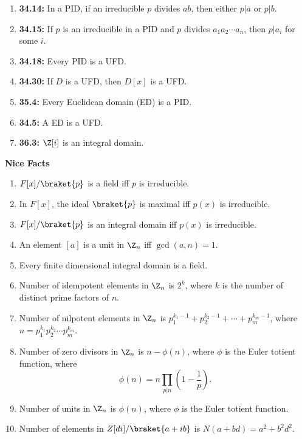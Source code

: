 \documentclass[notitlepage]{report}
\begin{document}
\begin{enumerate}
    \item \textbf{34.14:} In a PID, if an irreducible $p$ divides $ab$, then either $p|a$ or $p|b$.
    \item \textbf{34.15:} If $p$ is an irreducible in a PID and $p$ divides $a_1a_2\cdots a_n$, then $p|a_i$ for some $i$.
    \item \textbf{34.18:} Every PID is a UFD.
    \item \textbf{34.30:} If $D$ is a UFD, then $D[x]$ is a UFD.
    \item \textbf{35.4:} Every Euclidean domain (ED) is a PID.
    \item \textbf{34.5:} A ED is a UFD.
    \item \textbf{36.3:} $\Z[i]$ is an integral domain.
  \end{enumerate}

  \textbf{Nice Facts}
  \begin{enumerate}
    \item $F[x]/\braket{p}$ is a field iff $p$ is irreducible.
    \item In $F[x]$, the ideal $\braket{p}$ is maximal iff $p(x)$ is irreducible.
    \item $F[x]/\braket{p}$ is an integral domain iff $p(x)$ is irreducible.
    \item An element $[a]$ is a unit in $\Z_n$ iff $\gcd(a, n) = 1$.
    \item Every finite dimensional integral domain is a field.
    \item Number of idempotent elements in $\Z_n$ is $2^k$, where $k$ is the number of distinct prime factors of $n$.
    \item Number of nilpotent elements in $\Z_n$ is $p_1^{k_1 - 1} + p_2^{k_2 - 1} + \cdots + p_m^{k_m - 1}$, where $n = p_1^{k_1}p_2^{k_2}\cdots p_m^{k_m}$.
    \item Number of zero divisors in $\Z_n$ is $n - \phi(n)$, where $\phi$ is the Euler totient function, where
      \[%
        \phi(n) = n\prod_{p|n} \left(1 - \frac{1}{p}\right)
      .\]%
    \item Number of units in $\Z_n$ is $\phi(n)$, where $\phi$ is the Euler totient function.
    \item Number of elements in $Z[di]/\braket{a + ib}$ is $N(a + bd) = a^2 + b^2d^2$.
  \end{enumerate}
\end{document}

